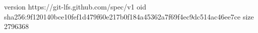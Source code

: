 version https://git-lfs.github.com/spec/v1
oid sha256:9f120140bce10fef1d479f60e217b0f184a45362a7f69f4ec9dc514ac46ee7ce
size 2796368
